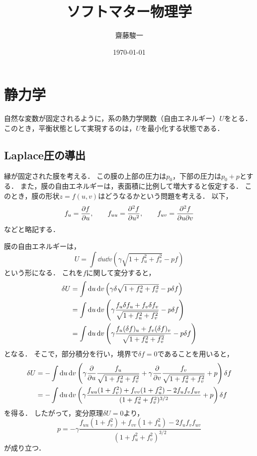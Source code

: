 \documentclass[a4paper,11pt]{jsarticle}
\begin{document}
\title{ソフトマター物理学}
\author{齋藤駿一}
\date{\today}
\maketitle

\tableofcontents

\section{静力学}
自然な変数が固定されるように，系の熱力学関数（自由エネルギー）$U$をとる．
このとき，平衡状態として実現するのは，$U$を最小化する状態である．

\subsection{Laplace圧の導出}
縁が固定された膜を考える．
この膜の上部の圧力は$p_0$，下部の圧力は$p_0+p$とする．
また，膜の自由エネルギーは，表面積に比例して増大すると仮定する．
このとき，膜の形状$z=f(u,v)$はどうなるかという問題を考える．
以下，
\begin{equation}
  f_u = \pdv{f}{u},\qquad f_{uu} = \pdv[2]{f}{u},\qquad f_{uv} = \pdv{f}{u}{v}
\end{equation}
などと略記する．

膜の自由エネルギーは，
\begin{equation}
  U = \int \dd{u} \dd{v} \left(\gamma \sqrt{1+f_u^2 + f_v^2} - pf\right)
\end{equation}
という形になる．
これを$f$に関して変分すると，
\begin{align}
  \delta U &= \int \dd{u} \dd{v} \left(\gamma \delta\sqrt{1+f_u^2 +f_v^2} - p\delta f\right) \notag\\
  &= \int \dd{u} \dd{v} \left(\gamma \frac{f_u\delta f_u + f_v \delta f_v}{\sqrt{1+f_u^2 + f_v^2}} - p\delta f\right) \notag\\
  &= \int \dd{u} \dd{v} \left(\gamma \frac{f_u(\delta f)_u + f_v (\delta f)_v}{\sqrt{1+f_u^2 + f_v^2}} - p\delta f\right)
\end{align}
となる．
そこで，部分積分を行い，境界で$\delta f = 0$であることを用いると，
\begin{align}
  \delta U &= -\int \dd{u} \dd{v} \left(\gamma \pdv{u}\frac{f_u}{\sqrt{1+f_u^2+ f_v^2}} + \gamma \pdv{v}\frac{f_v}{\sqrt{1+f_u^2 + f_v^2}} + p\right)\delta f\\
  &= - \int \dd{u} \dd{v} \left(\gamma \frac{f_{uu}(1+f_v^2) + f_{vv}(1+f_u^2)-2f_uf_vf_{uv}}{(1+f_u^2+f_v^2)^{3/2}} + p\right)\delta f
\end{align}
を得る．
したがって，変分原理$\delta U = 0$より，
\begin{equation}
  p = - \gamma \frac{f_{uu}(1+f_v^2) + f_{vv}(1+f_u^2)-2f_uf_vf_{uv}}{(1+f_u^2+f_v^2)^{3/2}} 
\end{equation}
が成り立つ．
\end{document}
